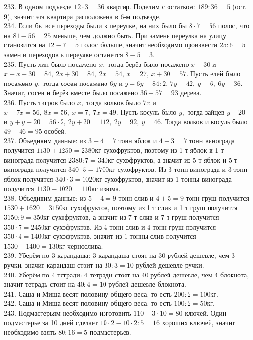 \documentclass[12pt]{article}
\begin{document}
233. В одном подъезде $12\cdot3=36$ квартир. Поделим с остатком: $189:36=5$ (ост. 9), значит эта квартира расположена в 6-м  подъезде.\\
234. Если бы все переходы были в переулке, на них было бы $8\cdot7=56$ полос, что на $81-56=25$ меньше, чем должно быть. При замене переулка на улицу становится на $12-7=5$ полос больше, значит необходимо произвести $25:5=5$ замен и переходов в переулке останется $8-5=3.$\\
235. Пусть лип было посажено $x,$ тогда берёз было посажено $x+30$ и $x+x+30=84,\ 2x+30=84,\ 2x=54,\ x=27,\ x+30=57.$ Пусть елей было посажено $y,$ тогда сосен посажено $6y$ и $y+6y=84:2,\ 7y=42,\ y=6,\ 6y=36.$ Значит, сосен и берёз вместе было посажено $36+57=93$ дерева.\\
236. Пусть тигров было $x,$ тогда волков было $7x$ и $x+7x=56,\ 8x=56,\ x=7,\ 7x=49.$ Пусть косуль было $y,$ тогда зайцев $y+20$ и $y+y+20=56\cdot2,\ 2y+20=112,\ 2y=92,\ y=46.$ Тогда волков и косуль было $49+46=95$ особей.\\
237. Объединим данные: из $3+4=7$ тонн яблок и $4+3=7$ тонн винограда получится $1130+1250=2380$кг сухофруктов, поэтому из 1 т яблок и 1 т винограда получится $2380:7=340$кг сухофруктов, а значит из 5 т яблок и 5 т винограда получится $340\cdot5=1700$кг сухофруктов. Из 3 тонн винограда и 3 тонн яблок получится $340\cdot3=1020$кг сухофруктов, значит из 1 тонны винограда получится $1130-1020=110$кг изюма.\\
238. Объединим данные: из $5+4=9$ тонн слив и $4+5=9$ тонн груш получится $1530+1620=3150$кг сухофруктов, поэтому из 1 т слив и 1 т груш получится $3150:9=350$кг сухофруктов, а значит из 7 т слив и 7 т груш получится $350\cdot7=2450$кг сухофруктов. Из 4 тонн слив и 4 тонн груш получится $350\cdot4=1400$кг сухофруктов, значит из 1 тонны слив получится $1530-1400=130$кг чернослива.\\
239. Уберём по 3 карандаша: 3 карандаша стоят на 30 рублей дешевле, чем 3 ручки, значит карандаш стоит на $30:3=10$ рублей дешевле ручки.\\
240. Уберём по 4 тетради: 4 тетради стоят на 40 рублей дешевле, чем 4 блокнота, значит тетрадь стоит на $40:4=10$ рублей дешевле блокнота.\\
241. Саша и Миша весят половину общего веса, то есть $200:2=100$кг.\\
242. Саша и Миша весят половину общего веса, то есть $100:2=50$кг.\\
243. Подмастерьям необходимо изготовить $110-3\cdot10=80$ ключей. Один подмастерье за 10 дней сделает $10\cdot2-10\cdot2:5=16$ хороших ключей, значит необходимо взять $80:16=5$ подмастерьев.\\
\end{document}
